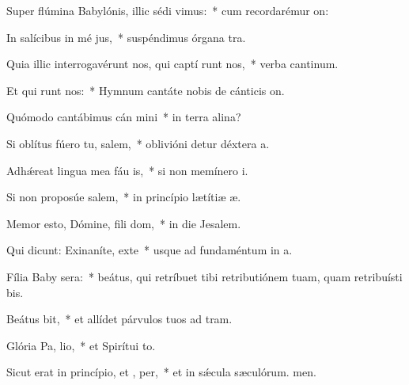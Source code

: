 \item Super flúmina Babylónis, illic sédi  vimus:~* cum recordarémur on:
\item In salícibus in mé jus,~* suspéndimus órgana tra.
\item Quia illic interrogavérunt nos, qui captí runt nos,~* verba cantinum.
\item Et qui runt nos:~* Hymnum cantáte nobis de cánticis on.
\item Quómodo cantábimus cán mini~* in terra alina?
\item Si oblítus fúero tu, salem,~* oblivióni detur déxtera a.
\item Adhǽreat lingua mea fáu is,~* si non memínero i.
\item Si non proposúe salem,~* in princípio lætítiæ æ.
\item Memor esto, Dómine, fili dom,~* in die Jesalem.
\item Qui dicunt: Exinaníte, exte~* usque ad fundaméntum in a.
\item Fília Baby sera:~* beátus, qui retríbuet tibi retributiónem tuam, quam retribuísti bis.
\item Beátus  bit,~* et allídet párvulos tuos ad tram.
\item Glória Pa,  lio,~* et Spirítui to.
\item Sicut erat in princípio, et ,  per,~* et in sǽcula sæculórum. men.
